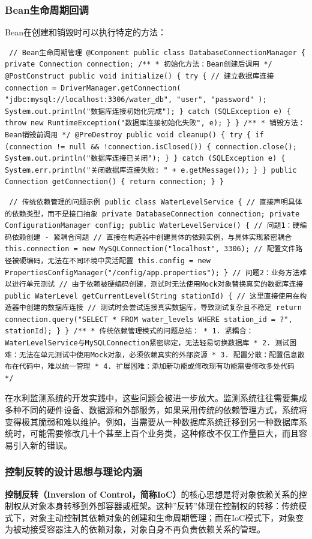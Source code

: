 \subsubsection{Bean生命周期回调}\label{beanux751fux547dux5468ux671fux56deux8c03} Bean在创建和销毁时可以执行特定的方法： \begin{verbatim} // Bean生命周期管理 @Component public class DatabaseConnectionManager { private Connection connection; /** * 初始化方法：Bean创建后调用 */ @PostConstruct public void initialize() { try { // 建立数据库连接 connection = DriverManager.getConnection( "jdbc:mysql://localhost:3306/water_db", "user", "password" ); System.out.println("数据库连接初始化完成"); } catch (SQLException e) { throw new RuntimeException("数据库连接初始化失败", e); } } /** * 销毁方法：Bean销毁前调用 */ @PreDestroy public void cleanup() { try { if (connection != null && !connection.isClosed()) { connection.close(); System.out.println("数据库连接已关闭"); } } catch (SQLException e) { System.err.println("关闭数据库连接失败: " + e.getMessage()); } } public Connection getConnection() { return connection; } } \end{verbatim} \begin{verbatim} // 传统依赖管理的问题示例 public class WaterLevelService { // 直接声明具体的依赖类型，而不是接口抽象 private DatabaseConnection connection; private ConfigurationManager config; public WaterLevelService() { // 问题1：硬编码依赖创建 - 紧耦合问题 // 直接在构造器中创建具体的依赖实例，与具体实现紧密耦合 this.connection = new MySQLConnection("localhost", 3306); // 配置文件路径被硬编码，无法在不同环境中灵活配置 this.config = new PropertiesConfigManager("/config/app.properties"); } // 问题2：业务方法难以进行单元测试 // 由于依赖被硬编码创建，测试时无法使用Mock对象替换真实的数据库连接 public WaterLevel getCurrentLevel(String stationId) { // 这里直接使用在构造器中创建的数据库连接 // 测试时会尝试连接真实数据库，导致测试复杂且不稳定 return connection.query("SELECT * FROM water_levels WHERE station_id = ?", stationId); } } /** * 传统依赖管理模式的问题总结： * 1. 紧耦合：WaterLevelService与MySQLConnection紧密绑定，无法轻易切换数据库 * 2. 测试困难：无法在单元测试中使用Mock对象，必须依赖真实的外部资源 * 3. 配置分散：配置信息散布在代码中，难以统一管理 * 4. 扩展困难：添加新功能或修改现有功能需要修改多处代码 */ \end{verbatim} 在水利监测系统的开发实践中，这些问题会被进一步放大。监测系统往往需要集成多种不同的硬件设备、数据源和外部服务，如果采用传统的依赖管理方式，系统将变得极其脆弱和难以维护。例如，当需要从一种数据库系统迁移到另一种数据库系统时，可能需要修改几十个甚至上百个业务类，这种修改不仅工作量巨大，而且容易引入新的错误。 \subsubsection{控制反转的设计思想与理论内涵}\label{ux63a7ux5236ux53cdux8f6cux7684ux8bbeux8ba1ux601dux60f3ux4e0eux7406ux8bbaux5185ux6db5} \textbf{控制反转（Inversion of Control，简称IoC）}的核心思想是将对象依赖关系的控制权从对象本身转移到外部容器或框架。这种''反转''体现在控制权的转移：传统模式下，对象主动控制其依赖对象的创建和生命周期管理；而在IoC模式下，对象变为被动接受容器注入的依赖对象，对象自身不再负责依赖关系的管理。 